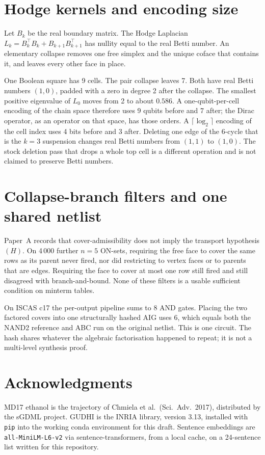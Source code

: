 \documentclass[11pt]{article}
\begin{document}
\section{Hodge kernels and encoding size}
Let $B_k$ be the real boundary matrix.  The Hodge Laplacian
$L_k=B_k^\top B_k+B_{k+1}B_{k+1}^\top$ has nullity equal to the real Betti
number.  An elementary collapse removes one free simplex and the unique
coface that contains it, and leaves every other face in place.



One Boolean square has 9 cells.  The pair collapse leaves 7.  Both have real
Betti numbers $(1,0)$, padded with a zero in degree 2 after the collapse.
The smallest positive eigenvalue of $L_0$ moves from 2 to about $0.586$.
A one-qubit-per-cell encoding of the chain space therefore uses 9 qubits
before and 7 after; the Dirac operator, as an operator on that space, has
those orders.  A $\lceil\log_2\rceil$ encoding of the cell index uses 4 bits
before and 3 after.
Deleting one edge of the 6-cycle that is the $k=3$ suspension changes real
Betti numbers from $(1,1)$ to $(1,0)$.  The stock deletion pass that drops a
whole top cell is a different operation and is not claimed to preserve Betti
numbers.

\section{Collapse-branch filters and one shared netlist}
Paper~A records that cover-admissibility does not imply the transport
hypothesis $(H)$.  On 4\,000 further $n=5$ ON-sets, requiring the free face to
cover the same rows as its parent never fired, nor did restricting to vertex
faces or to parents that are edges.  Requiring the face to cover at most one
row still fired and still disagreed with branch-and-bound.  None of these
filters is a usable sufficient condition on minterm tables.

On ISCAS c17 the per-output pipeline sums to 8 AND gates.  Placing the two
factored covers into one structurally hashed AIG uses 6, which equals both
the NAND2 reference and ABC run on the original netlist.  This is one
circuit.  The hash shares whatever the algebraic factorisation happened to
repeat; it is not a multi-level synthesis proof.

\section*{Acknowledgments}
MD17 ethanol is the trajectory of Chmiela et al.\ (Sci.\ Adv.\ 2017),
distributed by the sGDML project.  GUDHI is the INRIA library, version 3.13,
installed with \texttt{pip} into the working conda environment for this
draft.  Sentence embeddings are \texttt{all-MiniLM-L6-v2} via
sentence-transformers, from a local cache, on a 24-sentence list written for
this repository.
\end{document}
